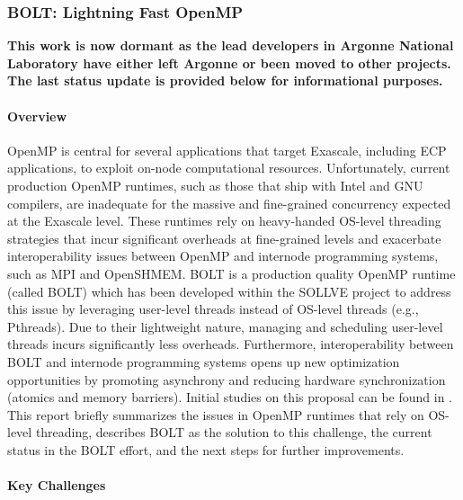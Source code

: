 \subsubsection{ BOLT: Lightning Fast OpenMP}\label{subsubsect:bolt}


\textbf{This work is now dormant as the lead developers in Argonne National Laboratory have either left Argonne or been moved to other projects. The last status update is provided below for informational purposes.}

\paragraph{Overview}

OpenMP is central for several applications that target Exascale,
including ECP applications, to exploit on-node computational
resources.  Unfortunately, current production OpenMP runtimes, such as
those that ship with Intel and GNU compilers, are inadequate for the
massive and fine-grained concurrency expected at the Exascale level.
These runtimes rely on heavy-handed OS-level threading strategies that
incur significant overheads at fine-grained levels and exacerbate
interoperability issues between OpenMP and internode programming
systems, such as MPI and OpenSHMEM.  BOLT is a production quality
OpenMP runtime (called BOLT) which has been developed within the
SOLLVE project to address this issue by leveraging user-level threads
instead of OS-level threads (e.g., Pthreads).  Due to their
lightweight nature, managing and scheduling user-level threads incurs
significantly less overheads.  Furthermore, interoperability between
BOLT and internode programming systems opens up new optimization
opportunities by promoting asynchrony and reducing hardware
synchronization (atomics and memory barriers).  Initial studies on
this proposal can be found in \cite{amer2018, ccgrid, ppopp}. This
report briefly summarizes the issues in OpenMP runtimes that rely on
OS-level threading, describes BOLT as the solution to this challenge,
the current status in the BOLT effort, and the next steps for further
improvements.

\paragraph{Key Challenges}

